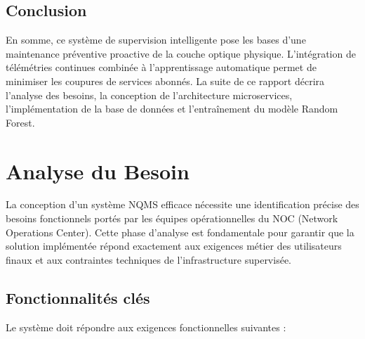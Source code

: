 \documentclass[11pt,a4paper]{article}
\begin{document}
\subsection{Conclusion}
En somme, ce système de supervision intelligente pose les bases d'une maintenance préventive proactive de la couche optique physique. L'intégration de télémétries continues combinée à l'apprentissage automatique permet de minimiser les coupures de services abonnés. La suite de ce rapport décrira l'analyse des besoins, la conception de l'architecture microservices, l'implémentation de la base de données et l'entraînement du modèle Random Forest.

\newpage

\section{Analyse du Besoin}

La conception d'un système NQMS efficace nécessite une identification précise des besoins fonctionnels portés par les équipes opérationnelles du NOC (Network Operations Center). Cette phase d'analyse est fondamentale pour garantir que la solution implémentée répond exactement aux exigences métier des utilisateurs finaux et aux contraintes techniques de l'infrastructure supervisée.

\subsection{Fonctionnalités clés}

Le système doit répondre aux exigences fonctionnelles suivantes :
\end{document}
